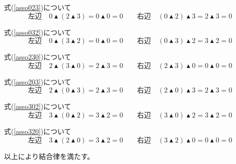 \documentclass[12pt,b5paper]{ltjsarticle}
\begin{document}
\begin{enumerate}
      式(\ref{asso023})について
      \begin{equation}
       \text{左辺} \quad
        0 \blacktriangle ( 2 \blacktriangle 3 )
        = 0 \blacktriangle 0 = 0 \qquad
       \text{右辺} \quad
        (0 \blacktriangle  2) \blacktriangle 3
        = 2 \blacktriangle 3 = 0
      \end{equation}

      式(\ref{asso032})について
      \begin{equation}
       \text{左辺} \quad
        0 \blacktriangle ( 3 \blacktriangle 2 )
        = 0 \blacktriangle 0 = 0 \qquad
       \text{右辺} \quad
        (0 \blacktriangle  3) \blacktriangle 2
        = 3 \blacktriangle 2 = 0
      \end{equation}

      式(\ref{asso230})について
      \begin{equation}
       \text{左辺} \quad
        2 \blacktriangle ( 3 \blacktriangle 0 )
        = 2 \blacktriangle 3 = 0 \qquad
       \text{右辺} \quad
        (2 \blacktriangle  3) \blacktriangle 0
        = 0 \blacktriangle 0 = 0
      \end{equation}

      式(\ref{asso203})について
      \begin{equation}
       \text{左辺} \quad
        2 \blacktriangle ( 0 \blacktriangle 3 )
        = 2 \blacktriangle 3 = 0 \qquad
       \text{右辺} \quad
        (2 \blacktriangle  0) \blacktriangle 3
        = 2 \blacktriangle 3 = 0
      \end{equation}

      式(\ref{asso302})について
      \begin{equation}
       \text{左辺} \quad
        3 \blacktriangle ( 0 \blacktriangle 2 )
        = 3 \blacktriangle 2 = 0 \qquad
       \text{右辺} \quad
        (3 \blacktriangle  0) \blacktriangle 2
        = 3 \blacktriangle 2 = 0
      \end{equation}

      式(\ref{asso320})について
      \begin{equation}
       \text{左辺} \quad
        3 \blacktriangle ( 2 \blacktriangle 0 )
        = 3 \blacktriangle 2 = 0 \qquad
       \text{右辺} \quad
        (3 \blacktriangle  2) \blacktriangle 0
        = 0 \blacktriangle 0 = 0
      \end{equation}


      以上により結合律を満たす。


\end{enumerate}
\end{document}
